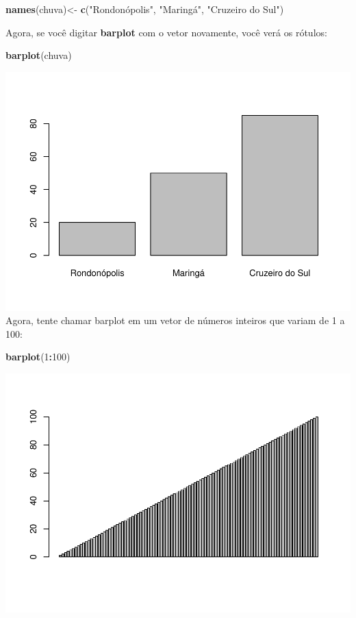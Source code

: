 \documentclass[]{book}
\newenvironment{Shaded}{\begin{snugshade}}{\end{snugshade}}
\newcommand{\DecValTok}[1]{\textcolor[rgb]{0.00,0.00,0.81}{#1}}
\newcommand{\KeywordTok}[1]{\textcolor[rgb]{0.13,0.29,0.53}{\textbf{#1}}}
\newcommand{\NormalTok}[1]{#1}
\newcommand{\OperatorTok}[1]{\textcolor[rgb]{0.81,0.36,0.00}{\textbf{#1}}}
\newcommand{\StringTok}[1]{\textcolor[rgb]{0.31,0.60,0.02}{#1}}
\begin{document}
\begin{Shaded}
\begin{Highlighting}[]
\KeywordTok{names}\NormalTok{(chuva)<-}\StringTok{ }\KeywordTok{c}\NormalTok{(}\StringTok{"Rondonópolis", "}\NormalTok{Maringá}\StringTok{", "}\NormalTok{Cruzeiro do Sul}\StringTok{")}
\end{Highlighting}
\end{Shaded}

Agora, se você digitar \textbf{barplot} com o vetor novamente, você verá os rótulos:

\begin{Shaded}
\begin{Highlighting}[]
\KeywordTok{barplot}\NormalTok{(chuva)}
\end{Highlighting}
\end{Shaded}

\includegraphics{TudodoR_files/figure-latex/unnamed-chunk-34-1.pdf}
Agora, tente chamar barplot em um vetor de números inteiros que variam de 1 a 100:

\begin{Shaded}
\begin{Highlighting}[]
\KeywordTok{barplot}\NormalTok{(}\DecValTok{1}\OperatorTok{:}\DecValTok{100}\NormalTok{)}
\end{Highlighting}
\end{Shaded}

\includegraphics{TudodoR_files/figure-latex/unnamed-chunk-35-1.pdf}
\end{document}
